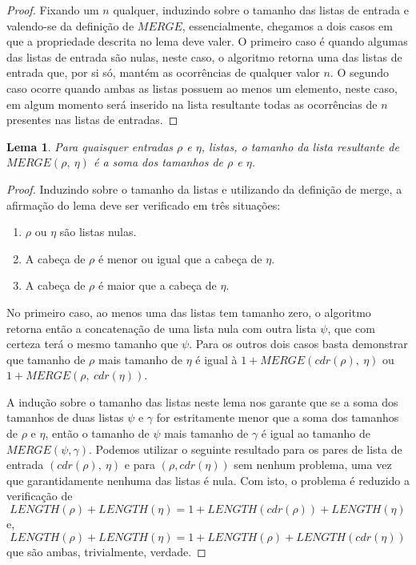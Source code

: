 \documentclass[12pt]{article}
\newtheorem{lemma}[theorem]{Lema}
\theoremstyle{definition}
\begin{document}
\begin{proof}
        Fixando um $n$ qualquer, induzindo sobre o tamanho das listas de entrada e valendo-se da definição de $MERGE$, essencialmente,
        chegamos a dois casos em que a propriedade descrita no lema deve valer. O primeiro caso é quando algumas das listas de
        entrada são nulas, neste caso, o algoritmo retorna uma das listas de entrada que, por si só, mantém as ocorrências de
        qualquer valor $n$. O segundo caso ocorre quando ambas as listas possuem ao menos um elemento, neste caso, em algum momento será inserido
        na lista resultante todas as ocorrências de $n$ presentes nas listas de entradas.
\end{proof}

\begin{lemma}
\label{merge-preserves-length}
        Para quaisquer entradas $\rho$ e $\eta$, listas, o tamanho da lista resultante de $MERGE(\rho,\ \eta)$ é a soma
        dos tamanhos de $\rho$ e $\eta$.
\end{lemma}

\begin{proof}
        Induzindo sobre o tamanho da listas e utilizando da definição de merge, a afirmação do
        lema deve ser verificado em três situações:
        \begin{enumerate}
                \item $\rho$ ou $\eta$ são listas nulas.
                \item A cabeça de $\rho$ é menor ou igual que a cabeça de $\eta$.
                \item A cabeça de $\rho$ é maior que a cabeça de $\eta$.
        \end{enumerate}

        No primeiro caso, ao menos uma das listas tem tamanho zero, o algoritmo retorna então a concatenação de uma
        lista nula com outra lista $\psi$, que com certeza terá o mesmo tamanho que $\psi$. Para os outros dois casos
        basta demonstrar que tamanho de $\rho$ mais tamanho de $\eta$ é igual à $1 + MERGE(cdr(\rho),\ \eta)$ ou
        $1 + MERGE(\rho,\ cdr(\eta))$. 

        A indução sobre o tamanho das listas neste lema nos garante que se a soma dos tamanhos de duas listas $\psi$ e $\gamma$ 
        for estritamente menor que a soma dos tamanhos de $\rho$ e $\eta$, então o tamanho de $\psi$ mais tamanho de $\gamma$ é igual ao tamanho
        de $MERGE(\psi, \gamma)$. Podemos utilizar o seguinte resultado para os pares de lista de entrada $(cdr(\rho),\ \eta)$ 
        e para $(\rho, cdr(\eta))$ sem nenhum problema, uma vez que garantidamente nenhuma das listas é nula. Com isto, o problema
        é reduzido a verificação de
        \begin{equation*}
                LENGTH(\rho) + LENGTH(\eta) = 1 + LENGTH(cdr(\rho)) + LENGTH(\eta)
        \end{equation*}
        e,
        \begin{equation*}
                LENGTH(\rho) + LENGTH(\eta) = 1 + LENGTH(\rho) + LENGTH(cdr(\eta))
        \end{equation*}
        que são ambas, trivialmente, verdade.
\end{proof}
\end{document}
